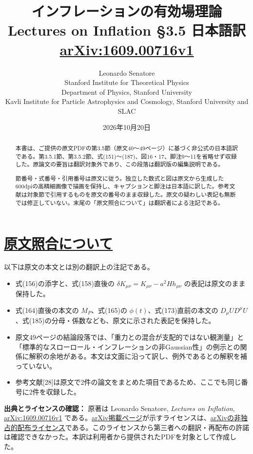 \documentclass[a4paper,11pt]{ltjsarticle}
\title{\bfseries インフレーションの有効場理論\\[4pt]\large Lectures on Inflation §3.5 日本語訳\\[3pt]\normalsize\href{https://arxiv.org/pdf/1609.00716v1}{arXiv:1609.00716v1}}
\author{Leonardo Senatore\\\small Stanford Institute for Theoretical Physics\\\small Department of Physics, Stanford University\\\small Kavli Institute for Particle Astrophysics and Cosmology, Stanford University and SLAC}
\date{2026年10月20日}
\numberwithin{equation}{section}
\begin{document}
\nocite{Maldacena:2002vr,Cornwall:1974km,Cheung:2007st,Behbahani:2011it,Achucarro:2012sm,Seery:2006vu,Pimentel:2012tw,Senatore:2009cf,Senatore:2012ya}
\maketitle
\begin{abstract}
本書は、ご提供の原文PDFの第3.5節（原文40～49ページ）に基づく非公式の日本語訳である。第3.5.1節、第3.5.2節、式(151)～(187)、図16・17、脚注9～11を省略せず収録した。原論文の要旨は翻訳対象外であり、この段落は翻訳版の編集説明である。

節番号・式番号・引用番号は原文に従う。独立した数式と図は原文から生成した600dpiの高精細画像で描画を保持し、キャプションと脚注は日本語に訳した。参考文献は対象節で引用するものを原文の番号のまま収録した。原文の疑わしい表記も無断では修正していない。末尾の「原文照合について」は翻訳者による注記である。
\end{abstract}
\hypertarget{toc}{}
\tableofcontents
\clearpage
\setcounter{section}{3}
\setcounter{subsection}{4}



\clearpage
{}
{}
\section*{\hyperlink{toc}{原文照合について}}
\noindent 以下は原文の本文とは別の翻訳上の注記である。
\begin{itemize}
\item 式(156)の添字と、式(158)直後の $\delta K_{\mu\nu}=K_{\mu\nu}-a^2Hh_{\mu\nu}$ の表記は原文のまま保持した。
\item 式(164)直後の本文の $M_P$、式(165)の $\phi(t)$、式(173)直前の本文の $D_\mu U D^\mu U$、式(185)の分母・係数なども、原文に示された表記を保持した。
\item 原文49ページの結論段落では、「重力との混合が支配的ではない観測量」と「標準的なスローロール・インフレーションの非Gaussian性」の例示との関係に解釈の余地がある。本文は文面に沿って訳し、例外であるとの解釈を補っていない。
\item 参考文献[28]は原文で2件の論文をまとめた項目であるため、ここでも同じ番号に2件を収録した。
\end{itemize}
\noindent\textbf{出典とライセンスの確認：}
原著は Leonardo Senatore, \textit{Lectures on Inflation}, \href{https://arxiv.org/pdf/1609.00716v1}{arXiv:1609.00716v1} である。\href{https://arxiv.org/abs/1609.00716v1}{arXiv掲載ページ}が示すライセンスは、\href{https://arxiv.org/licenses/nonexclusive-distrib/1.0/license.html}{arXivの非独占的配布ライセンス}である。このライセンスから第三者への翻訳・再配布の許諾は確認できなかった。本訳は利用者から提供されたPDFを対象として作成した。

\newpage
\renewcommand{\refname}{\hyperlink{toc}{参考文献}}



\end{document}
